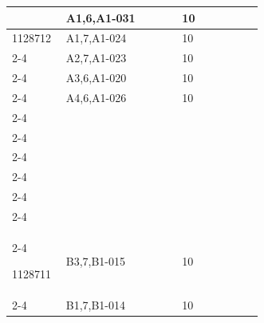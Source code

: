 \documentclass[UTF8,10pt,a4paper,fontset=fandol]{ctexart}
\newcommand{\fieldvalue}[1]{#1}
\newcommand{\handwritten}[1]{#1}
\begin{document}
\begin{tabular}{|p{0.20\linewidth}|p{0.43\linewidth}|p{0.20\linewidth}|p{0.10\linewidth}|}
&
\fieldvalue{\handwritten{A1,6,A1-031}} &
\fieldvalue{\handwritten{10}} &
\tabularnewline
\hline

\fieldvalue{\handwritten{1128712}} &
\fieldvalue{\handwritten{A1,7,A1-024}} &
\fieldvalue{\handwritten{10}} &
\tabularnewline
\cline{2-4}

&
\fieldvalue{\handwritten{A2,7,A1-023}} &
\fieldvalue{\handwritten{10}} &
\tabularnewline
\cline{2-4}

&
\fieldvalue{\handwritten{A3,6,A1-020}} &
\fieldvalue{\handwritten{10}} &
\tabularnewline
\cline{2-4}

&
\fieldvalue{\handwritten{A4,6,A1-026}} &
\fieldvalue{\handwritten{10}} &
\tabularnewline
\cline{2-4}

& \rule{0pt}{2.2em} & & \tabularnewline
\cline{2-4}
& \rule{0pt}{2.2em} & & \tabularnewline
\cline{2-4}
& \rule{0pt}{2.2em} & & \tabularnewline
\cline{2-4}
& \rule{0pt}{2.2em} & & \tabularnewline
\cline{2-4}
& \rule{0pt}{2.2em} & & \tabularnewline
\cline{2-4}
& \rule{0pt}{2.2em} & & \tabularnewline
\cline{2-4}

\fieldvalue{\handwritten{1128711}} &
\fieldvalue{\handwritten{B3,7,B1-015}} &
\fieldvalue{\handwritten{10}} &
\tabularnewline
\cline{2-4}

&
\fieldvalue{\handwritten{B1,7,B1-014}} &
\fieldvalue{\handwritten{10}} &
\tabularnewline
\hline
\end{tabular}
\end{document}
